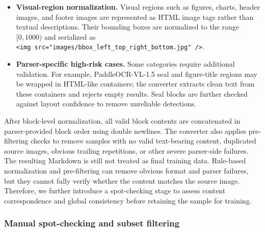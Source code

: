 \begin{itemize}
    \item \textbf{Visual-region normalization.}
    Visual regions such as figures, charts, header images, and footer images are represented as HTML image tags rather than textual descriptions. Their bounding boxes are normalized to the range $[0,1000)$ and serialized as \\ \texttt{<img src="images/bbox\_left\_top\_right\_bottom.jpg" />}.

    \item \textbf{Parser-specific high-risk cases.}
    Some categories require additional validation. For example, PaddleOCR-VL-1.5 seal and figure-title regions may be wrapped in HTML-like containers; the converter extracts clean text from these containers and rejects empty results. Seal blocks are further checked against layout confidence to remove unreliable detections.
\end{itemize}

After block-level normalization, all valid block contents are concatenated in parser-provided block order using double newlines. The converter also applies pre-filtering checks to remove samples with no valid text-bearing content, duplicated source images, obvious trailing repetitions, or other severe parser-side failures. The resulting Markdown is still not treated as final training data. Rule-based normalization and pre-filtering can remove obvious format and parser failures, but they cannot fully verify whether the content matches the source image. Therefore, we further introduce a spot-checking stage to assess content correspondence and global consistency before retaining the sample for training.

\subsubsection{Manual spot-checking and subset filtering}

